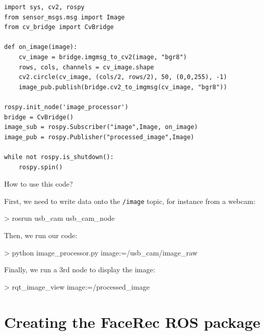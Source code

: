 \documentclass[compress]{beamer}
\begin{document}
{\begin{frame}[containsverbatim]{}

\begin{verbatim}
import sys, cv2, rospy
from sensor_msgs.msg import Image
from cv_bridge import CvBridge

def on_image(image):
    cv_image = bridge.imgmsg_to_cv2(image, "bgr8")
    rows, cols, channels = cv_image.shape
    cv2.circle(cv_image, (cols/2, rows/2), 50, (0,0,255), -1)
    image_pub.publish(bridge.cv2_to_imgmsg(cv_image, "bgr8"))

rospy.init_node('image_processor')
bridge = CvBridge()
image_sub = rospy.Subscriber("image",Image, on_image)
image_pub = rospy.Publisher("processed_image",Image)

while not rospy.is_shutdown():
    rospy.spin()
\end{verbatim}

\end{frame}

\begin{frame}[fragile]{How to use this code?}

First, we need to write data onto the \texttt{/image} topic, for instance from a
webcam:

\begin{shcode}
> rosrun usb_cam usb_cam_node
\end{shcode}

\pause

Then, we run our code:

\begin{shcode}
> python image_processor.py image:=/usb_cam/image_raw
\end{shcode}

\pause

Finally, we run a 3rd node to display the image:

\begin{shcode}
> rqt_image_view image:=/processed_image
\end{shcode}

\end{frame}


\section[]{Creating the FaceRec ROS package}

}
\end{document}
